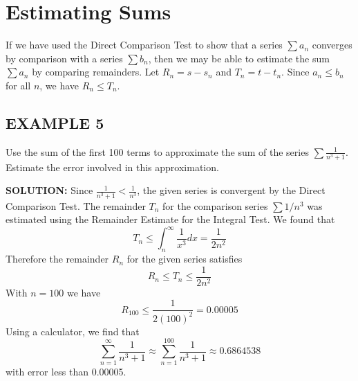 \documentclass{article}
\begin{document}
\section*{Estimating Sums}
If we have used the Direct Comparison Test to show that a series \( \sum a_n \) converges by comparison with a series \( \sum b_n \), then we may be able to estimate the sum \( \sum a_n \) by comparing remainders. Let \(R_n = s - s_n\) and \(T_n = t - t_n\). Since \(a_n \le b_n\) for all \(n\), we have \(R_n \le T_n\).

\subsection*{EXAMPLE 5}
Use the sum of the first 100 terms to approximate the sum of the series \( \sum \frac{1}{n^3 + 1} \). Estimate the error involved in this approximation.

\textbf{SOLUTION:}
Since $\frac{1}{n^3 + 1} < \frac{1}{n^3}$, the given series is convergent by the Direct Comparison Test. The remainder $T_n$ for the comparison series $\sum 1/n^3$ was estimated using the Remainder Estimate for the Integral Test. We found that
\[ T_n \le \int_n^\infty \frac{1}{x^3} dx = \frac{1}{2n^2} \]
Therefore the remainder $R_n$ for the given series satisfies
\[ R_n \le T_n \le \frac{1}{2n^2} \]
With $n=100$ we have
\[ R_{100} \le \frac{1}{2(100)^2} = 0.00005 \]
Using a calculator, we find that
\[ \sum_{n=1}^{\infty} \frac{1}{n^3 + 1} \approx \sum_{n=1}^{100} \frac{1}{n^3 + 1} \approx 0.6864538 \]
with error less than 0.00005.
\end{document}

